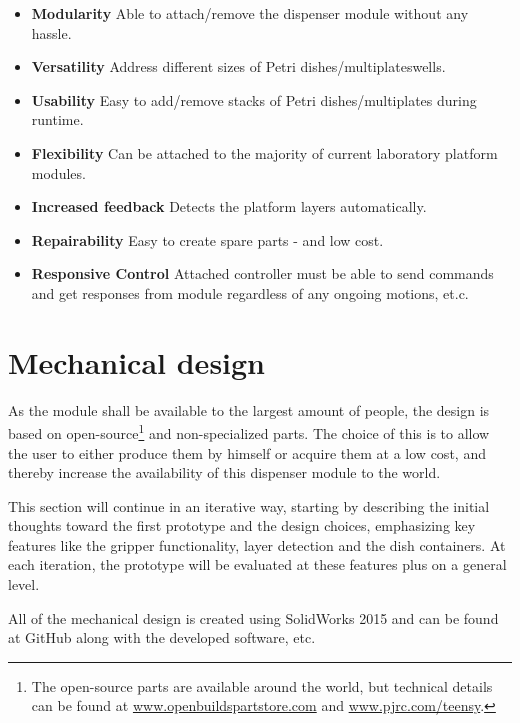 \documentclass[10pt,a4paper]{article}
\begin{document}
	\begin{itemize}
		\item \textbf{Modularity} Able to attach/remove the dispenser module without any hassle.
		\item \textbf{Versatility} Address different sizes of Petri dishes/multiplateswells.
		\item \textbf{Usability} Easy to add/remove stacks of Petri dishes/multiplates during runtime.
		\item \textbf{Flexibility} Can be attached to the majority of current laboratory platform modules.
		\item \textbf{Increased feedback} Detects the platform layers automatically.
		\item \textbf{Repairability} Easy to create spare parts - and low cost.
		\item \textbf{Responsive Control} Attached controller must be able to send commands and get responses from module regardless of any ongoing motions, et.c.
	\end{itemize}
	\newpage
	
	\section{Mechanical design}
	
	As the module shall be available to the largest amount of people, the design is based on open-source\footnote{The open-source parts are available around the world, but technical details can be found at \url{www.openbuildspartstore.com} and \url{www.pjrc.com/teensy}.} and non-specialized parts. The choice of this is to allow the user to either produce them by himself or acquire them at a low cost, and thereby increase the availability of this dispenser module to the world. 
	
	This section will continue in an iterative way, starting by describing the initial thoughts toward the first prototype and the design choices, emphasizing key features like the gripper functionality, layer detection and the dish containers. At each iteration, the prototype will be evaluated at these features plus on a general level.
	
	All of the mechanical design is created using SolidWorks 2015\cite{solidworks_webpage} and can be found at GitHub\cite{github_dispenserProject} along with the developed software, etc.
			
\end{document}
